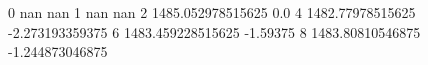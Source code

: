0 nan nan
1 nan nan
2 1485.052978515625 0.0
4 1482.77978515625 -2.273193359375
6 1483.459228515625 -1.59375
8 1483.80810546875 -1.244873046875
